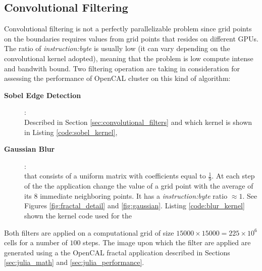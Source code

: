 \subsection{Convolutional Filtering}
Convolutional filtering is not a perfectly parallelizable problem since grid points on the boundaries requires values from grid points that resides on different GPUs. The ratio of \textit{instruction:byte} is  usually low (it can vary depending on the convolutional kernel adopted), meaning that the problem is low compute intense and bandwith bound.
Two filtering operation are taking in consideration for assessing the performance of OpenCAL cluster on this kind of algorithm:
\begin{description}
	\item[\textbf{Sobel Edge Detection}]:\\ Described in Section \ref{sec:convolutional_filters} and which kernel is shown in Listing \ref{code:sobel_kernel},
	\item[\textbf{Gaussian Blur}]:\\ that consists of a  uniform matrix  with coefficients equal to $\frac{1}{9}$. At each step of the the application change the value of a grid point with the average of its $8$ immediate neighboring points. It has a \textit{instruction:byte} ratio $\approx 1$. See Figures \ref{fig:fractal_detail} and \ref{fig:gaussian}. Listing \ref{code:blur_kernel} shown the kernel code used for the
\end{description}
Both filters are applied on a computational grid of size $15000 \times 15000=225 \times10^6$ cells for a number of $100$ steps. The image upon which the filter are applied are generated using a the OpenCAL fractal application described in Sections \ref{sec:julia_math} and \ref{sec:julia_performance}.

